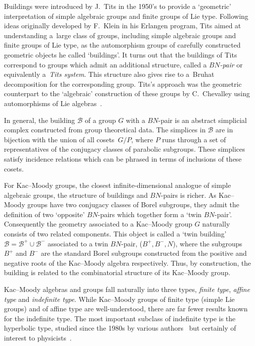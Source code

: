 \documentclass[pdftex]{sigma}
\numberwithin{equation}{section}
\def\cB{\mathcal B}
\begin{document}
Buildings were introduced by J.~Tits in the 1950's to provide a `geometric' interpretation of simple algebraic groups and finite groups of Lie type. Following ideas originally developed by F.~Klein in his Erlangen program, Tits aimed at understanding a~large class of groups, including simple algebraic groups and finite groups of Lie type, as the automorphism groups of carefully constructed geometric objects he called `buildings'. It turns out that the buildings of Tits correspond to groups which admit an additional structure, called a \emph{$BN$-pair} or equivalently a~\emph{Tits system}. This structure also gives rise to a~Bruhat decomposition for the corresponding group. Tits's approach was the geometric counterpart to the `algebraic' construction of these groups by C.~Chevalley using automorphisms of Lie algebras~\cite{Chevalley55}.

In general, the building $\cB$ of a group $G$ with a $BN$-pair is an abstract simplicial complex constructed from group theoretical data. The simplices in $\cB$ are in bijection with the union of all cosets~$G/P$, where $P$ runs through a set of representatives of the conjugacy classes of parabolic subgroups. These simplices satisfy incidence relations which can be phrased in terms of inclusions of these cosets.

For Kac--Moody groups, the closest infinite-dimensional analogue of simple algebraic groups, the structure of buildings and $BN$-pairs is richer. As Kac--Moody groups have two conjugacy classes of Borel subgroups, they admit the definition of two `opposite' $BN$-pairs which together form a `twin $BN$-pair'. Consequently the geometry associated to a Kac--Moody group $G$ naturally consists of two related components. This object is called a `twin building' $\cB=\cB^+\cup \cB^-$ associated to a twin $BN$-pair, \big($B^+, B^-, N$\big), where the subgroups $B^+$ and $B^-$ are the standard Borel subgroups constructed from the positive and negative roots of the Kac--Moody algebra respectively. Thus, by construction, the building is related to the combinatorial structure of its Kac--Moody group.

Kac--Moody algebras and groups fall naturally into three types, {\em finite type}, {\em affine type} and {\em indefinite type}. While Kac--Moody groups of finite type (simple Lie groups) and of affine type are well-understood, there are far fewer results known for the indefinite type. The most important subclass of indefinite type is the hyperbolic type, studied since the 1980s by various authors~\cite{Feingold80, FeingoldFrenkel83, KMW88, KangMelville95, LepowskyMoody79} but certainly of interest to physicists~\cite{DamourHenneauxNicolai02, DamourHillmann09, DamourKleinschmidtNicolai11, DamourSpindel13, Julia85, West01}.
\end{document}
